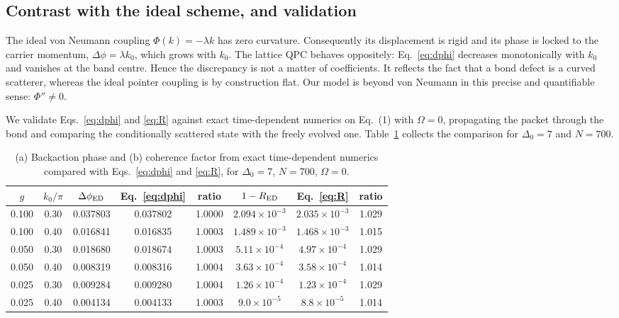 \documentclass[10pt,
 amsmath,amssymb,
 aps,prb, twocolumn
]{revtex4-2}
\begin{document}
\subsection{Contrast with the ideal scheme, and validation}
\label{app:vn:contrast}

The ideal von Neumann coupling $\Phi(k)=-\lambda k$ has zero curvature.
Consequently its displacement is rigid and its phase is locked to the
carrier momentum, $\Delta\phi=\lambda k_0$, which grows with $k_0$. The
lattice QPC behaves oppositely: Eq.~\eqref{eq:dphi} decreases
monotonically with $k_0$ and vanishes at the band centre. Hence the
discrepancy is not a matter of coefficients. It reflects the fact that a
bond defect is a curved scatterer, whereas the ideal pointer coupling is by
construction flat. Our model is beyond von Neumann in this precise and
quantifiable sense: $\Phi''\neq0$.

We validate Eqs.~\eqref{eq:dphi} and \eqref{eq:R} against exact
time-dependent numerics on Eq.~(1) with $\Omega=0$, propagating the packet
through the bond and comparing the conditionally scattered state with the
freely evolved one. Table~\ref{tab:vn} collects the comparison for
$\Delta_0=7$ and $N=700$.

\begin{table}[t]
\caption{(a) Backaction phase and (b) coherence factor from exact
time-dependent numerics compared with Eqs.~\eqref{eq:dphi} and
\eqref{eq:R}, for $\Delta_0=7$, $N=700$, $\Omega=0$.}
\label{tab:vn}
\begin{ruledtabular}
\begin{tabular}{cc cc c cc c}
$g$ & $k_0/\pi$ & $\Delta\phi_{\rm ED}$ & Eq.~\eqref{eq:dphi} & ratio
& $1-R_{\rm ED}$ & Eq.~\eqref{eq:R} & ratio\\
\hline
0.100 & 0.30 & 0.037803 & 0.037802 & 1.0000 & $2.094\times10^{-3}$ & $2.035\times10^{-3}$ & 1.029\\
0.100 & 0.40 & 0.016841 & 0.016835 & 1.0003 & $1.489\times10^{-3}$ & $1.468\times10^{-3}$ & 1.015\\
0.050 & 0.30 & 0.018680 & 0.018674 & 1.0003 & $5.11\times10^{-4}$  & $4.97\times10^{-4}$  & 1.029\\
0.050 & 0.40 & 0.008319 & 0.008316 & 1.0004 & $3.63\times10^{-4}$  & $3.58\times10^{-4}$  & 1.014\\
0.025 & 0.30 & 0.009284 & 0.009280 & 1.0004 & $1.26\times10^{-4}$  & $1.23\times10^{-4}$  & 1.029\\
0.025 & 0.40 & 0.004134 & 0.004133 & 1.0003 & $9.0\times10^{-5}$   & $8.8\times10^{-5}$   & 1.014\\
\end{tabular}
\end{ruledtabular}
\end{table}
\end{document}
